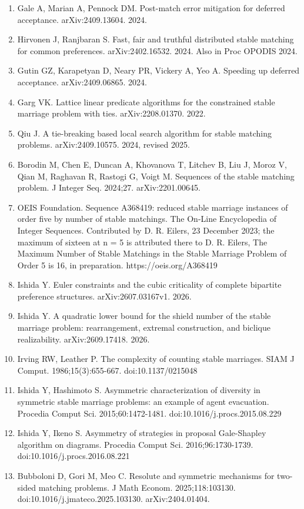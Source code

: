 \documentclass[
  11pt,
]{article}
\begin{document}
\begin{enumerate}
\item
  Gale A, Marian A, Pennock DM. Post-match error mitigation for deferred
  acceptance. arXiv:2409.13604. 2024.
\item
  Hirvonen J, Ranjbaran S. Fast, fair and truthful distributed stable
  matching for common preferences. arXiv:2402.16532. 2024. Also in Proc
  OPODIS 2024.
\item
  Gutin GZ, Karapetyan D, Neary PR, Vickery A, Yeo A. Speeding up
  deferred acceptance. arXiv:2409.06865. 2024.
\item
  Garg VK. Lattice linear predicate algorithms for the constrained
  stable marriage problem with ties. arXiv:2208.01370. 2022.
\item
  Qiu J. A tie-breaking based local search algorithm for stable matching
  problems. arXiv:2409.10575. 2024, revised 2025.
\item
  Borodin M, Chen E, Duncan A, Khovanova T, Litchev B, Liu J, Moroz V,
  Qian M, Raghavan R, Rastogi G, Voigt M. Sequences of the stable
  matching problem. J Integer Seq. 2024;27. arXiv:2201.00645.
\item
  OEIS Foundation. Sequence A368419: reduced stable marriage instances
  of order five by number of stable matchings. The On-Line Encyclopedia
  of Integer Sequences. Contributed by D. R. Eilers, 23 December 2023;
  the maximum of sixteen at n = 5 is attributed there to D. R. Eilers,
  The Maximum Number of Stable Matchings in the Stable Marriage Problem
  of Order 5 is 16, in preparation. https://oeis.org/A368419
\item
  Ishida Y. Euler constraints and the cubic criticality of complete
  bipartite preference structures. arXiv:2607.03167v1. 2026.
\item
  Ishida Y. A quadratic lower bound for the shield number of the stable
  marriage problem: rearrangement, extremal construction, and biclique
  realizability. arXiv:2609.17418. 2026.
\item
  Irving RW, Leather P. The complexity of counting stable marriages.
  SIAM J Comput. 1986;15(3):655-667. doi:10.1137/0215048
\item
  Ishida Y, Hashimoto S. Asymmetric characterization of diversity in
  symmetric stable marriage problems: an example of agent evacuation.
  Procedia Comput Sci. 2015;60:1472-1481.
  doi:10.1016/j.procs.2015.08.229
\item
  Ishida Y, Ikeno S. Asymmetry of strategies in proposal Gale-Shapley
  algorithm on diagrams. Procedia Comput Sci. 2016;96:1730-1739.
  doi:10.1016/j.procs.2016.08.221
\item
  Bubboloni D, Gori M, Meo C. Resolute and symmetric mechanisms for
  two-sided matching problems. J Math Econom. 2025;118:103130.
  doi:10.1016/j.jmateco.2025.103130. arXiv:2404.01404.
\end{enumerate}
\end{document}
